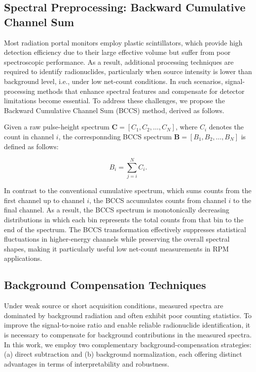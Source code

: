 \documentclass[10pt]{wlscirep}
\begin{document}
\subsection*{Spectral Preprocessing: Backward Cumulative Channel Sum}

Most radiation portal monitors employ plastic scintillators, which provide high detection efficiency due to their large effective volume but suffer from poor spectroscopic performance. As a result, additional processing techniques are required to identify radionuclides, particularly when source intensity is lower than background level, i.e., under low net-count conditions. In such scenarios, signal-processing methods that enhance spectral features and compensate for detector limitations become essential. To address these challenges, we propose the Backward Cumulative Channel Sum (BCCS) method, derived as follows.

Given a raw pulse-height spectrum $\mathbf{C} = [C_1, C_2, \ldots, C_N]$, where $C_i$ denotes the count in channel $i$, the corresponnding BCCS spectrum $\mathbf{B} = [B_1, B_2, \ldots , B_N]$ is defined as follows: 

\begin{equation}
B_i = \sum_{j=i}^N C_i.
\end{equation}

In contrast to the conventional cumulative spectrum, which sums counts from the first channel up to channel $i$, the BCCS accumulates counts from channel $i$ to the final channel. As a result, the BCCS spectrum is monotonically decreasing distributions in which each bin represents the total counts from that bin to the end of the spectrum. The BCCS transformation effectively suppresses statistical fluctuations in higher-energy channels while preserving the overall spectral shapes, making it particularly useful low net-count measurements in RPM applications. 

\subsection*{Background Compensation Techniques}

Under weak source or short acquisition conditions, measured spectra are dominated by background radiation and often exhibit poor counting statistics. To improve the signal-to-noise ratio and enable reliable radionuclide identification, it is necessary to compensate for background contributions in the measured spectra. In this work, we employ two complementary background-compensation strategies: (a) direct subtraction and (b) background normalization, each offering distinct advantages in terms of interpretability and robustness.
\end{document}

